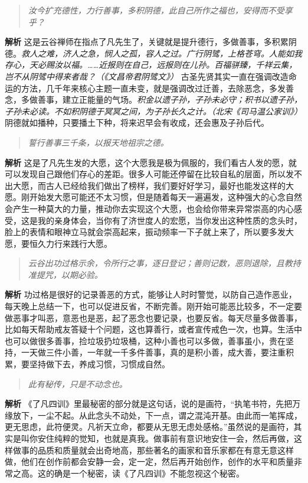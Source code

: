 \begin{quote}\it
    汝今扩充德性，力行善事，多积阴德，此自己所作之福也，安得而不受享乎？
\end{quote}

\textbf{解析} 这是云谷禅师在指点了凡先生了，关键就是提升德行，多做善事，多积累阴德。\textit{救人之难，济人之急，悯人之孤，容人之过。广行阴骘，上格苍穹。人能如我存心，天必赐汝以福。……近报则在自己，远报则在儿孙。百福骈臻，千祥云集，岂不从阴骘中得来者哉？（《文昌帝君阴骘文》）} 古圣先贤其实一直在强调改造命运的方法，几千年来核心主题一直未变，就是强调改过迁善，去除恶念，多发善念，多做善事，建立正能量的气场。\textit{积金以遗子孙，子孙未必守；积书以遗子孙，子孙未必读。不如积阴德于冥冥之间，为子孙长久之计。（北宋《司马温公家训》）} 阴德就如播种，只要播土下种，将来迟早会有收成，还会惠及子孙后代。

\begin{quote}\it
    誓行善事三千条，以报天地祖宗之德。
\end{quote}

\textbf{解析} 这是了凡先生发的大愿，这个大愿我是极为佩服的，我们看古人发的愿，就可以发现自己跟他们存心的差距。很多人可能还停留在比较自私的层面，所以发不出大愿，而古人已经给我们做出了榜样，我们要好好学习，最好也能发这样的大愿。刚开始发大愿可能还不太习惯，但是随着每天一遍遍发，这种强大的心念自然会产生一种莫大的力量，推动你去实现这个大愿，也会给你带来异常崇高的内心感受，这是我的亲身体会，当你有了济世度人的宏愿，当你发出这种性质的念头时，脸上的表情和眼神立马就会崇高起来，振动频率一下子就上来了，所以要多发大愿，要恒久力行来践行大愿。

\begin{quote}\it
    云谷出功过格示余，令所行之事，逐日登记；善则记数，恶则退除，且教持准提咒，以期必验。
\end{quote}

\textbf{解析} 功过格是很好的记录善恶的方式，能够让人时时警觉，以防自己造作恶业，每天晚上总结一下，也可以促进反省，不断完善。刚开始可能恶比较多，不一定要做恶事才叫恶，意恶也是恶，起了恶念也要记录，也要反省。每天尽量多做善事，比如每天帮助戒友答疑十个问题，这也算善行，或者宣传戒色一次，也算。生活中也可以做很多善事，捡垃圾扔垃圾桶，这种小善也可以多做，善事虽小，贵在坚持，一天做三件小善，一年就一千多件善事，真的是积小善，成大善，要注重积累，要坚持做下去，养成习惯，习惯成自然。

\begin{quote}\it
    此有秘传，只是不动念也。
\end{quote}

\textbf{解析} 《了凡四训》里最秘密的部分就是这句话，说的是画符，“执笔书符，先把万缘放下，一尘不起。从此念头不动处，下一点，谓之混沌开基。由此而一笔挥成，更无思虑，此符便灵。凡祈天立命，都要从无思无虑处感格。”虽然说的是画符，其实是叫你安住纯粹的觉知，也就是真我。做事前有意识地安住一会，然后再做，这样做事的品质和质量就会出奇地高，那些著名的画家和音乐家都在有意无意这样做，他们在创作前都会安静一会，定一定，然后再开始创作，创作的水平和质量非常之高。这的确是一个秘密，读《了凡四训》不能忽视这个秘密。

